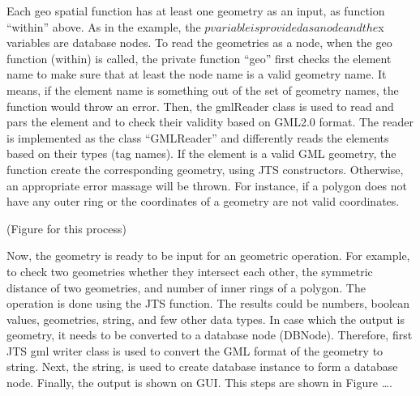 Each geo spatial function has at least one geometry as an input, as function “within” above. As in the example, the $p variable is provided as a node and the $x variables are database nodes. To read the geometries as a node, when the geo function (within) is called, the private function “geo” first checks the element name to make sure that at least the node name is a valid geometry name. It means, if the element name is something out of the set of geometry names, the function would throw an error. 
Then, the gmlReader class is used to read and pars the element and to check their validity based on GML2.0 format. The reader is implemented as the class “GMLReader” and differently reads the elements based on their types (tag names). If the element is a valid GML geometry, the function create the corresponding geometry, using JTS constructors. Otherwise, an appropriate error massage will be thrown. For instance, if a polygon does not have any outer ring or the coordinates of a geometry are not valid coordinates. 

(Figure for this process)

Now, the geometry is ready to be input for an geometric operation. For example, to check two geometries whether they intersect each other, the symmetric distance of two geometries, and number of inner rings of a polygon. The operation is done using the JTS function. The results could be numbers, boolean values, geometries, string, and few other data types. In case which the output is geometry, it needs to be converted to a database node (DBNode). Therefore, first JTS gml writer class is used to convert the GML format of the geometry to string. Next, the string, is used to create database instance to form a database node. Finally, the output is shown on GUI. This steps are shown in Figure ….
